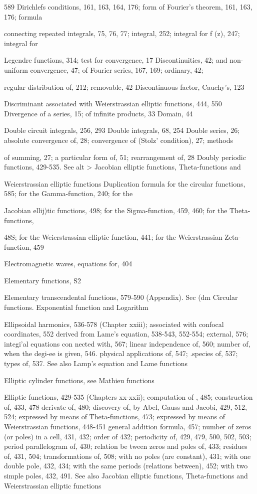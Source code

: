 589
Dirichlefs conditions, 161, 163, 164, 176; form of Fourier's theorem, 161, 163, 176; formula

connecting repeated integrals, 75, 76, 77; integral, 252; integral for f (z), 247; integral for

Legendre functions, 314; test for convergence, 17
Discontinuities, 42; and non-uniform convergence, 47; of Fourier series, 167, 169; ordinary, 42;

regular distribution of, 212; removable, 42
Discontinuous factor, Cauchy's, 123

Discriminant associated with Weierstrassian elliptic functions, 444, 550
Divergence of a series, 15; of infinite products, 33
Domain, 44

Double circuit integrals, 256, 293
Double integrals, 68, 254
Double series, 26; absolute convergence of, 28; convergence of (Stolz' condition), 27; methods

of summing, 27; a particular form of, 51; rearrangement of, 28
Doubly periodic functions, 429-535. See alt > Jacobian elliptic functions, Theta-functions and

Weierstrassian elliptic functions
Duplication formula for the circular functions, 585; for the Gamma-function, 240; for the

Jacobian ellij)tic functions, 498; for the Sigma-function, 459, 460; for the Theta-functions,

48S; for the Weierstrassian elliptic function, 441; for the Weierstrassian Zeta-function, 459

Electromagnetic waves, equations for, 404

Elementary functions, S2

Elementary transcendental functions, 579-590 (Appendix). Sec (dm Circular functions.
Exponential function and Logarithm

Ellipsoidal harmonics, 536-578 (Chapter xxiii); associated with confocal coordinates, 552
derived from Lame's equation, 538-543, 552-554; external, 576; integi'al equations con
nected with, 567; linear independence of, 560; number of, when the degi-ee is given, 546.
physical applications of, 547; .species of, 537; types of, 537. See also Lamp's equation
and Lame functions

Elliptic cylinder functions, see Mathieu functions

Elliptic functions, 429-535 (Chapters xx-xxii); computation of , 485; construction of, 433, 478
derivate of, 480; discovery of, by Abel, Gauss and Jacobi, 429, 512, 524; expressed by
means of Theta-functions, 473; expressed by means of Weierstrassian functions, 448-451
general addition formula, 457; number of zeros (or poles) in a cell, 431, 432; order of
432; periodicity of, 429, 479, 500, 502, 503; period parallelogram of, 430; relation be
tween zeros and poles of, 433; residues of, 431, 504; transformations of, 508; with no
poles (are constant), 431; with one double pole, 432, 434; with the same periods (relations
between), 452; with two simple poles, 432, 491. See also Jacobian elliptic functions,
Theta-functions and Weierstrassian elliptic functions

